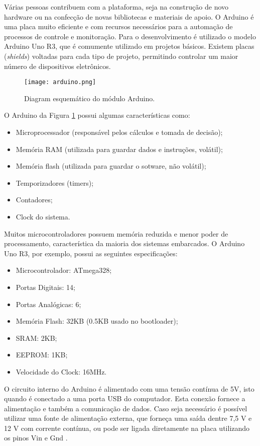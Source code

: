 \documentclass[12pt,report,cor2018]{uftpibic}
\begin{document}
Várias pessoas contribuem com a plataforma, seja na construção de novo hardware ou na confecção de novas bibliotecas e materiais de apoio. O Arduino é uma placa muito eficiente e com recursos necessários para a automação de processos de controle e monitoração. Para o desenvolvimento é utilizado o modelo Arduino Uno R3, que é comumente utilizado em projetos básicos. Existem placas ({\it shields}) voltadas para cada tipo de projeto, permitindo controlar um maior número de dispositivos eletrônicos.

\begin{figure}[!h]
\centering
\texttt{[image: arduino.png]}
\caption{Diagram esquemático do módulo Arduino.}
\label{fig:arduino}
\end{figure}

O Arduino da Figura \ref{fig:arduino} possui algumas características como:

\begin{itemize}
\item Microprocessador (responsável pelos cálculos e tomada de decisão);
\item Memória RAM (utilizada para guardar dados e instruções, volátil);
\item Memória flash (utilizada para guardar o sotware, não volátil);
\item Temporizadores (timers);
\item Contadores;
\item Clock do sistema.
\end{itemize}

Muitos microcontroladores possuem memória reduzida e menor poder de processamento, característica da maioria dos sistemas embarcados. O Arduino Uno R3, por exemplo, possui as seguintes especificações:

\begin{itemize}
\item Microcontrolador: ATmega328;
\item Portas Digitais: 14;
\item Portas Analógicas: 6;
\item Memória Flash: 32KB (0.5KB usado no bootloader);
\item SRAM: 2KB;
\item EEPROM: 1KB;
\item Velocidade do Clock: 16MHz.
\end{itemize}

O circuito interno do Arduino é alimentado com uma tensão contínua de 5V, isto quando é conectado a uma porta USB do computador. Esta conexão fornece a alimentação e também a comunicação de dados. Caso seja necessário é possível utilizar uma fonte de alimentação externa, que forneça uma saída dentre 7,5 V e 12 V com corrente contínua, ou pode ser ligada diretamente na placa utilizando os pinos Vin e Gnd \cite{marcos}.
\end{document}
